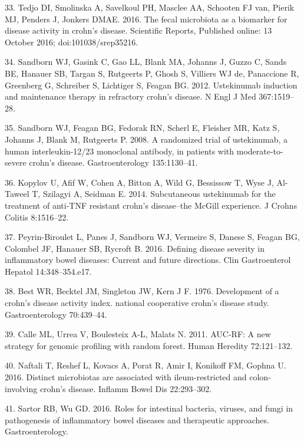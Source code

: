 \documentclass[11pt,]{article}
\begin{document}
\hypertarget{ref-tedjo_CDactivity_2016}{}
33. Tedjo DI, Smolinska A, Savelkoul PH, Masclee AA, Schooten FJ van,
Pierik MJ, Penders J, Jonkers DMAE. 2016. The fecal microbiota as a
biomarker for disease activity in crohn's disease. Scientific Reports,
Published online: 13 October 2016; doi:101038/srep35216.

\hypertarget{ref-sandborn_ust_2012}{}
34. Sandborn WJ, Gasink C, Gao LL, Blank MA, Johanns J, Guzzo C, Sands
BE, Hanauer SB, Targan S, Rutgeerts P, Ghosh S, Villiers WJ de,
Panaccione R, Greenberg G, Schreiber S, Lichtiger S, Feagan BG. 2012.
Ustekinumab induction and maintenance therapy in refractory crohn's
disease. N Engl J Med 367:1519--28.

\hypertarget{ref-sandborn_ust_2008}{}
35. Sandborn WJ, Feagan BG, Fedorak RN, Scherl E, Fleisher MR, Katz S,
Johanns J, Blank M, Rutgeerts P. 2008. A randomized trial of
ustekinumab, a human interleukin-12/23 monoclonal antibody, in patients
with moderate-to-severe crohn's disease. Gastroenterology 135:1130--41.

\hypertarget{ref-kopylov_ust_2014}{}
36. Kopylov U, Afif W, Cohen A, Bitton A, Wild G, Bessissow T, Wyse J,
Al-Taweel T, Szilagyi A, Seidman E. 2014. Subcutaneous ustekinumab for
the treatment of anti-TNF resistant crohn's disease--the McGill
experience. J Crohns Colitis 8:1516--22.

\hypertarget{ref-PB_CDAI_2016}{}
37. Peyrin-Biroulet L, Panes J, Sandborn WJ, Vermeire S, Danese S,
Feagan BG, Colombel JF, Hanauer SB, Rycroft B. 2016. Defining disease
severity in inflammatory bowel diseases: Current and future directions.
Clin Gastroenterol Hepatol 14:348--354.e17.

\hypertarget{ref-Best_CDAI_1976}{}
38. Best WR, Becktel JM, Singleton JW, Kern J F. 1976. Development of a
crohn's disease activity index. national cooperative crohn's disease
study. Gastroenterology 70:439--44.

\hypertarget{ref-calle_aucrf_2011}{}
39. Calle ML, Urrea V, Boulesteix A-L, Malats N. 2011. AUC-RF: A new
strategy for genomic profiling with random forest. Human Heredity
72:121--132.

\hypertarget{ref-naftali_tissinvol_2016}{}
40. Naftali T, Reshef L, Kovacs A, Porat R, Amir I, Konikoff FM, Gophna
U. 2016. Distinct microbiotas are associated with ileum-restricted and
colon-involving crohn's disease. Inflamm Bowel Dis 22:293--302.

\hypertarget{ref-sartor_microbesIBD_2016}{}
41. Sartor RB, Wu GD. 2016. Roles for intestinal bacteria, viruses, and
fungi in pathogenesis of inflammatory bowel diseases and therapeutic
approaches. Gastroenterology.
\end{document}
